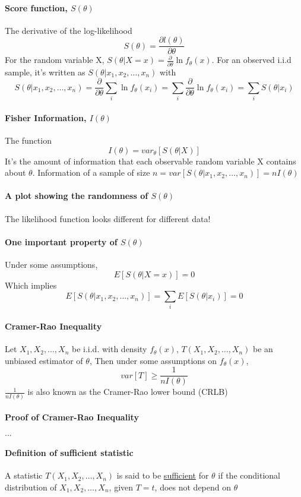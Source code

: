 \documentclass[11pt]{article}
\newcommand{\under}[1]{\underline{#1}}
\begin{document}
 \paragraph{Score function, $S(\theta)$}
 The derivative of the log-likelihood $$S(\theta) = \frac{\partial l(\theta)}{\partial \theta}$$
 For the random variable X, $S(\theta| X = x) = \frac{\partial}{\partial \theta} \ln f_\theta(x)$. For an observed i.i.d sample, it's written as $S(\theta|x_1,x_2,\hdots,x_n)$ with $$S(\theta|x_1,x_2,\hdots,x_n) = \frac{\partial}{\partial \theta} \sum_i \ln f_\theta(x_i) = \sum_i \frac{\partial}{\partial \theta} \ln f_\theta(x_i) = \sum_i S(\theta|x_i)$$
 \paragraph{Fisher Information, $I(\theta)$}
 The function $$I(\theta) = var_\theta[S(\theta|X)]$$ It's the amount of information that each observable random variable X contains about $\theta$. \newline
 Information of a sample of size $n = var[S(\theta|x_1,x_2,\hdots,x_n)] = nI(\theta)$
 \paragraph{A plot showing the randomness of $S(\theta)$}
 The likelihood function looks different for different data!
 \paragraph{One important property of $S(\theta)$}
 Under some assumptions, $$E[S(\theta|X = x)] = 0$$
 Which implies $$E[S(\theta|x_1,x_2,\hdots,x_n)] = \sum_i E[S(\theta|x_i)] = 0$$
 \paragraph{Cramer-Rao Inequality}
 Let $X_1, X_2, \hdots, X_n$ be i.i.d. with density $f_\theta(x)$,
 $T(X_1, X_2, \hdots, X_n)$ be an unbiased estimator of $\theta$,
 Then under some assumptions on $f_\theta(x)$, $$var[T] \geq \frac{1}{nI(\theta)}$$
 $\frac{1}{nI(\theta)}$ is also known as the Cramer-Rao lower bound (CRLB)
 \paragraph{Proof of Cramer-Rao Inequality}
 	$\hdots$
 \paragraph{Definition of sufficient statistic}
 A statistic $T(X_1, X_2, \hdots, X_n)$ is said to be \under{sufficient} for $\theta$ if the conditional distribution of $X_1, X_2, \hdots, X_n$, given $T = t$, does not depend on $\theta$
 
\end{document}
